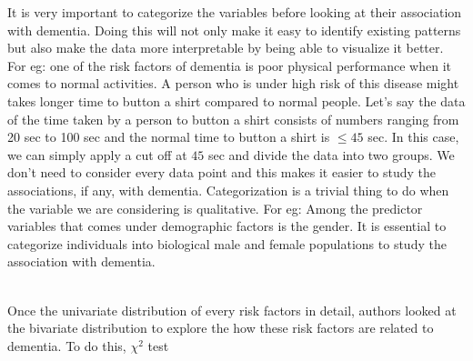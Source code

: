 \documentclass[12pt,letterpaper]{article}
\begin{document}
It is very important to categorize the variables before looking at their association with dementia. Doing this will not only make it easy to identify existing patterns but also make the data more interpretable by being able to visualize it better. For eg: one of the risk factors of dementia is poor physical performance when it comes to normal activities. A person who is under high risk of this disease might takes longer time to button a shirt compared to normal people.  Let's say the data of the time taken by a person to button a shirt consists of numbers ranging from 20 sec to 100 sec and the normal time to button a shirt is $\leq45$ sec. In this case, we can simply apply a cut off at $45$ sec and divide the data into two groups. We don't need to consider every data point and this makes it easier to study the associations, if any, with dementia. Categorization is a trivial thing to do when the variable we are considering is qualitative. For eg: Among the predictor variables that comes under demographic factors is the gender. It is essential to categorize individuals into biological male and female populations to study the association with dementia. 

\\



Once the univariate distribution of every risk factors in detail, authors looked at the bivariate distribution to explore the how these risk factors are related to dementia. To do this, $\chi^2$ test 
\end{document}
